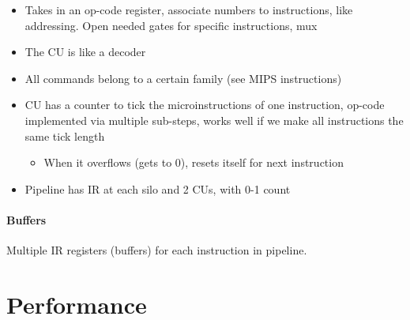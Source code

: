 \documentclass[12 pt]{article}
\begin{document}
	\begin{itemize}
	\item Takes in an op-code register, associate numbers to instructions, like addressing. Open needed gates for specific instructions, mux
	\item The CU is like a decoder
	\item All commands belong to a certain family (see MIPS instructions)
	\item CU has a counter to tick the microinstructions of one instruction, op-code implemented via multiple sub-steps, works well if we make all instructions the same tick length
	\begin{itemize}
	\item When it overflows (gets to 0), resets itself for next instruction
\end{itemize}
	\item Pipeline has IR at each silo and 2 CUs, with 0-1 count
\end{itemize}
\paragraph{Buffers}
Multiple IR registers (buffers) for each instruction in pipeline.
	 \section{Performance}
\end{document}
